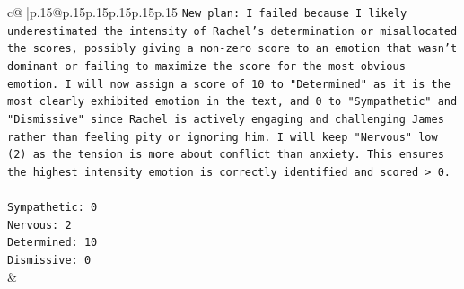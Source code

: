 \documentclass{article}
\begin{document}
{\begin{supertabular}{c@{$\;$}|p{.15\linewidth}@{}p{.15\linewidth}p{.15\linewidth}p{.15\linewidth}p{.15\linewidth}p{.15\linewidth}}
{{{\texttt{New plan: I failed because I likely underestimated the intensity of Rachel's determination or misallocated the scores, possibly giving a non{-}zero score to an emotion that wasn't dominant or failing to maximize the score for the most obvious emotion. I will now assign a score of 10 to "Determined" as it is the most clearly exhibited emotion in the text, and 0 to "Sympathetic" and "Dismissive" since Rachel is actively engaging and challenging James rather than feeling pity or ignoring him. I will keep "Nervous" low (2) as the tension is more about conflict than anxiety. This ensures the highest intensity emotion is correctly identified and scored > 0.} \\
\\ 
\texttt{Sympathetic: 0} \\
\texttt{Nervous: 2} \\
\texttt{Determined: 10} \\
\texttt{Dismissive: 0} \\
            }
        }
    }
    & \\ \\

\end{supertabular}
}
\end{document}

